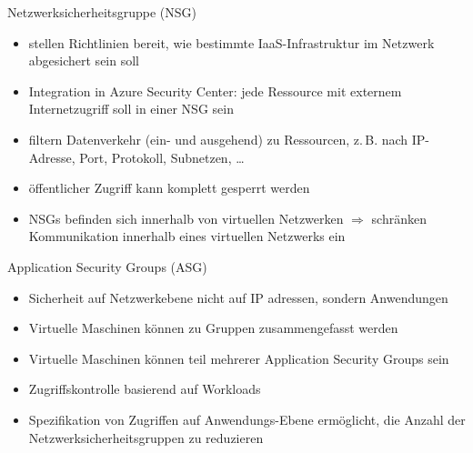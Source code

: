 
\begin{flashcard}[Definition]{Netzwerksicherheitsgruppe (NSG)}
    \begin{itemize}
        \item stellen Richtlinien bereit, wie bestimmte IaaS-Infrastruktur im Netzwerk abgesichert sein soll
        \item Integration in Azure Security Center: jede Ressource mit externem Internetzugriff soll in einer NSG sein
        \item filtern Datenverkehr (ein- und ausgehend) zu Ressourcen, z.\,B. nach IP-Adresse, Port, Protokoll, Subnetzen, \ldots
        \item öffentlicher Zugriff kann komplett gesperrt werden
        \item NSGs befinden sich innerhalb von virtuellen Netzwerken\newline
        $\Rightarrow$ schränken Kommunikation innerhalb eines virtuellen Netzwerks ein
    \end{itemize}

\end{flashcard}

\begin{flashcard}[Describe]{Application Security Groups (ASG)}
    \begin{itemize}
        \item Sicherheit auf Netzwerkebene nicht auf IP adressen, sondern Anwendungen
        \item Virtuelle Maschinen können zu Gruppen zusammengefasst werden
        \item Virtuelle Maschinen können teil mehrerer Application Security Groups sein
        \item Zugriffskontrolle basierend auf Workloads
        \item Spezifikation von Zugriffen auf Anwendungs-Ebene ermöglicht, die Anzahl der Netzwerksicherheitsgruppen zu reduzieren
    \end{itemize}
\end{flashcard}

